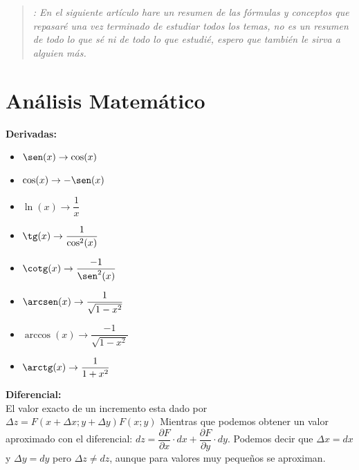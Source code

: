 \documentclass[12pt,a4paper]{article}
\begin{document}
\lhead{}
\rfoot{\thepage} %
\renewcommand{\headrulewidth}{0.4pt} %
\renewcommand{\footrulewidth}{0.4pt} %
\pagestyle{fancy}


\newpage

\tableofcontents
\newpage

\begin{quote}
\begin{center}

\abstractname{\textit{ : En el siguiente artículo hare un resumen de las fórmulas y conceptos que repasaré una vez terminado de estudiar todos los temas, no es un resumen de todo lo que sé ni de todo lo que estudié, espero que también le sirva a alguien más.}}

\end{center}
\end{quote}

\section{Análisis Matemático}

\textbf{Derivadas:}
\begin{itemize}
  \item $ \sen(x) \rightarrow \cos(x)$
  \item $ \cos(x) \rightarrow -\sen(x)$
  \item $ \ln(x) \rightarrow \dfrac{1}{x}$
  \item $ \tg(x) \rightarrow \dfrac{1}{\cos^2(x)}$
  \item $ \cotg(x) \rightarrow \dfrac{-1}{\sen^2(x)}$
  \item $ \arcsen(x) \rightarrow \dfrac{1}{\sqrt{1-x^2}}$
  \item $ \arccos(x) \rightarrow \dfrac{-1}{\sqrt{1-x^2}}$
  \item $ \arctg(x) \rightarrow \dfrac{1}{1+x^2}$
\end{itemize}

\textbf{Diferencial:} \\
El valor exacto de un incremento esta dado por $\Delta z = F(x+\Delta x; y +\Delta y )  F(x;y)$ Mientras que podemos obtener un valor aproximado con el diferencial: $dz= \dfrac{\partial F}{\partial x}\cdot dx +\dfrac{\partial F}{\partial y}\cdot dy $. Podemos decir que $\Delta x = dx$ y $\Delta y = dy$ pero $\Delta z \neq dz$, aunque para valores muy pequeños se aproximan.  \\
\end{document}
